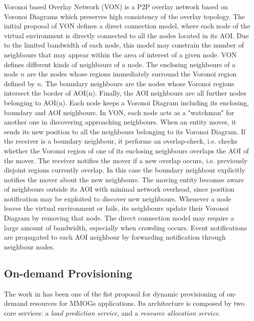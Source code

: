 \documentclass[final,10pt,a5paper]{phdimt}
\theoremstyle{definition}
\begin{document}
Voronoi based Overlay Network (VON) \cite{Hu2006} is a P2P overlay network based on Voronoi Diagrams which preserves high consistency of the overlay topology. 
The initial proposal of VON defines a direct connection model, where each node of the  virtual environment is directly connected to all the nodes located in its AOI. Due to the limited bandwidth of each node, this model may constrain the number of neighbours that may appear within the area of interest of a given node. VON defines different kinds of neighbours of a node. The enclosing neighbours of a node $n$ are the nodes whose regions immediately surround the Voronoi region defined by $n$.
The boundary neighbours are the nodes whose Voronoi regions intersect the border of AOI(n).
Finally, the AOI neighbours are all further nodes belonging to AOI(n).  Each node keeps a Voronoi Diagram including its enclosing, boundary and AOI neighbours. In VON, each node acts as a "watchman" for another one in discovering approaching neighbours. When an entity moves, it sends its new position to all the neighbours belonging to its Voronoi Diagram. If the receiver is a boundary neighbour, it performs an overlap-check, i.e. checks whether the Voronoi region of one of its enclosing neighbours overlaps the AOI of the mover. The receiver notifies the mover if a new overlap occurs, i.e. previously disjoint regions currently overlap. In this case the boundary neighbour explicitly notifies the mover about the new neighbours.
The moving entity becomes aware of neighbours outside its AOI with minimal network overhead, since position notification may be exploited to discover new neighbours.
Whenever a node leaves the virtual environment or fails, its neighbours update their Voronoi Diagram by removing that node.
The direct connection model may require a large amount of bandwidth, especially when crowding occurs. 
Event notifications are propagated to each AOI neighbour by forwarding notification through neighbour nodes.



\subsection{On-demand Provisioning}

The work in \cite{prodan2009prediction} has been one of the fist proposal for dynamic provisioning of on-demand resources for MMOGs applications.
Its architecture is composed by two core services: a \textit{load prediction service}, and a \textit{resource allocation service}.
\end{document}
